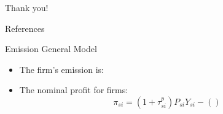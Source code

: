 \documentclass[aspectratio=169]{beamer}
\begin{document}
\begin{frame}[noframenumbering]
	\begin{center}
		\Huge
		Thank you!
	\end{center}
\end{frame}

\appendix
\footnotesize
	\begin{frame}[allowframebreaks]{References}
			

		
	\end{frame}
	
	\normalsize

	\begin{frame}{Emission General Model}\label{Emission_General_Model}
		\begin{itemize}
			\item The firm's emission is:
			
			\item The nominal profit for firms:
			\begin{equation}
				\pi_{si} = {(1+\tau_{si}^p) P_{si} Y_{si} - \left(\right)}
			\end{equation}
			\end{itemize}
			\hfill
			\hyperlink{Production_Functions}{}
	\end{frame}
\end{document}
